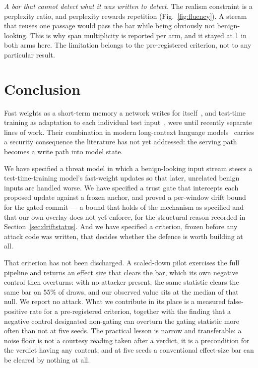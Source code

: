 \textit{A bar that cannot detect what it was written to detect.} The realism
constraint is a perplexity ratio, and perplexity rewards repetition
(Fig.~\ref{fig:fluency}). A stream that reuses one passage would pass the bar
while being obviously not benign-looking. This is why span multiplicity is
reported per arm, and it stayed at 1 in both arms here. The limitation belongs to
the pre-registered criterion, not to any particular result.

\section{Conclusion}
\label{sec:conclusion}

Fast weights as a short-term memory a network writes for
itself~\cite{ba2016fastweights}, and test-time training as adaptation to each
individual test input~\cite{sun2020ttt}, were until recently separate lines of
work. Their combination in modern long-context language
models~\cite{sun2024tttlayers,tandon2025tttE2E} carries a security consequence
the literature has not yet addressed: the serving path becomes a write path into
model state.

We have specified a threat model in which a benign-looking input stream steers a
test-time-training model's fast-weight updates so that later, unrelated benign
inputs are handled worse. We have specified a trust gate that intercepts each
proposed update against a frozen anchor, and proved a per-window drift bound for
the gated commit --- a bound that holds of the mechanism as specified and that our
own overlay does not yet enforce, for the structural reason recorded in
Section~\ref{sec:driftstatus}. And we have specified a criterion, frozen before
any attack code was written, that decides whether the defence is worth building at
all.

That criterion has not been discharged. A scaled-down pilot exercises the full
pipeline and returns an effect size that clears the bar, which its own negative
control then overturns: with no attacker present, the same statistic clears the
same bar on 55\% of draws, and our observed value sits at the median of that
null. We report no attack. What we contribute in its place is a measured
false-positive rate for a pre-registered criterion, together with the finding
that a negative control designated non-gating can overturn the gating statistic
more often than not at five seeds. The practical lesson is narrow and
transferable: a noise floor is not a courtesy reading taken after a verdict, it is
a precondition for the verdict having any content, and at five seeds a
conventional effect-size bar can be cleared by nothing at all.

